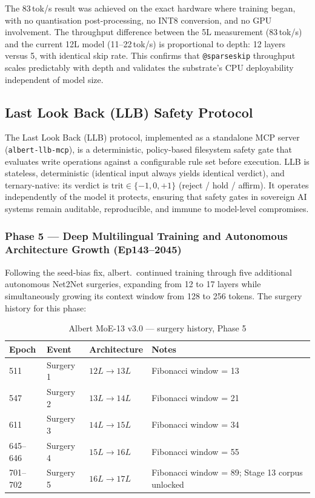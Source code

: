 \documentclass[11pt,a4paper]{article}
\begin{document}
The 83\,tok/s result was achieved on the exact hardware where training began,
with no quantisation post-processing, no INT8 conversion, and no GPU involvement.
The throughput difference between the 5L measurement (83\,tok/s) and the current
12L model (11--22\,tok/s) is proportional to depth: 12 layers versus 5, with
identical skip rate. This confirms that \texttt{@sparseskip} throughput scales
predictably with depth and validates the substrate's CPU deployability independent
of model size.

\subsection{Last Look Back (LLB) Safety Protocol}

The Last Look Back (LLB) protocol, implemented as a standalone MCP server
(\texttt{albert-llb-mcp}), is a deterministic, policy-based filesystem safety
gate that evaluates write operations against a configurable rule set before
execution. LLB is stateless, deterministic (identical input always yields
identical verdict), and ternary-native: its verdict is
$\mathrm{trit} \in \{-1, 0, +1\}$ (reject / hold / affirm). It operates
independently of the model it protects, ensuring that safety gates in sovereign
AI systems remain auditable, reproducible, and immune to model-level
compromises.

\subsubsection{Phase 5 --- Deep Multilingual Training and Autonomous Architecture Growth (Ep143--2045)}
\label{subsubsec:phase5}

Following the seed-bias fix, albert.\ continued training through five additional autonomous
Net2Net surgeries, expanding from 12 to 17 layers while simultaneously growing its context
window from 128 to 256 tokens. The surgery history for this phase:

\begin{table}[htbp]
\centering
\small
\caption{Albert MoE-13 v3.0 --- surgery history, Phase 5}
\label{tab:surgery_phase5}
\begin{tabular}{llll}
\toprule
Epoch & Event & Architecture & Notes \\
\midrule
511 & Surgery 1 & $12L \to 13L$ & Fibonacci window = 13 \\
547 & Surgery 2 & $13L \to 14L$ & Fibonacci window = 21 \\
611 & Surgery 3 & $14L \to 15L$ & Fibonacci window = 34 \\
645--646 & Surgery 4 & $15L \to 16L$ & Fibonacci window = 55 \\
701--702 & Surgery 5 & $16L \to 17L$ & Fibonacci window = 89; Stage 13 corpus unlocked \\
\bottomrule
\end{tabular}
\end{table}
\end{document}
